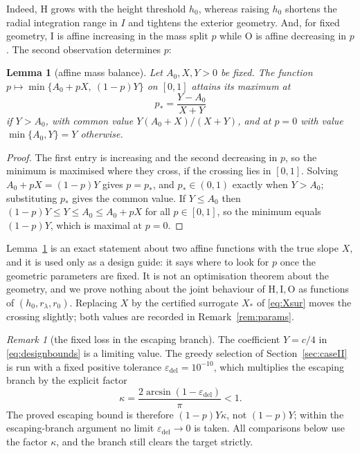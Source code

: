 \documentclass[11pt]{article}
\theoremstyle{plain}
\newtheorem{lemma}[theorem]{Lemma}
\theoremstyle{definition}
\theoremstyle{remark}
\newtheorem{remark}[theorem]{Remark}
\newcommand{\epsdel}{\varepsilon_{\mathrm{del}}}
\begin{document}
Indeed, $\mathrm{H}$ grows with the height threshold $h_{0}$, whereas raising $h_{0}$
shortens the radial integration range in $I$ and tightens the exterior geometry.
And, for fixed geometry, $\mathrm{I}$ is affine increasing in the mass split $p$
while $\mathrm{O}$ is affine decreasing in $p$. The second observation
determines $p$:

\begin{lemma}[affine mass balance]\label{lem:balance}
Let $A_{0},X,Y>0$ be fixed. The function
$p\mapsto\min\{A_{0}+pX,\ (1-p)Y\}$ on $[0,1]$ attains its maximum at
\[
  p_{*}=\frac{Y-A_{0}}{X+Y}
\]
if $Y>A_{0}$, with common value $Y(A_{0}+X)/(X+Y)$, and at $p=0$ with value
$\min\{A_0,Y\}=Y$ otherwise.
\end{lemma}

\begin{proof}
The first entry is increasing and the second decreasing in $p$, so the minimum
is maximised where they cross, if the crossing lies in $[0,1]$. Solving
$A_{0}+pX=(1-p)Y$ gives $p=p_{*}$, and $p_{*}\in(0,1)$ exactly when $Y>A_{0}$;
substituting $p_{*}$ gives the common value. If $Y\le A_{0}$ then
$(1-p)Y\le Y\le A_{0}\le A_{0}+pX$ for all $p\in[0,1]$, so the minimum equals
$(1-p)Y$, which is maximal at $p=0$.
\end{proof}

Lemma~\ref{lem:balance} is an exact statement about two affine functions with
the true slope $X$, and it is used only as a design guide: it says where to look
for $p$ once the geometric parameters are fixed. It is not an optimisation
theorem about the geometry, and we prove nothing about the joint behaviour of
$\mathrm{H},\mathrm{I},\mathrm{O}$ as functions of
$(h_{0},r_{\lambda},r_{0})$. Replacing $X$ by the certified surrogate $X_{*}$ of
\eqref{eq:Xsur} moves the crossing slightly; both values are recorded in
Remark~\ref{rem:params}.

\begin{remark}[the fixed loss in the escaping branch]\label{rem:kappaloss}
The coefficient $Y=c/4$ in \eqref{eq:designbounds} is a limiting value. The
greedy selection of Section~\ref{sec:caseII} is run with a fixed positive
tolerance $\epsdel=10^{-10}$, which multiplies the escaping branch by the
explicit factor
\[
  \kappa=\frac{2\arcsin(1-\epsdel)}{\pi}<1 .
\]
The proved escaping bound is therefore $(1-p)Y\kappa$, not $(1-p)Y$; within
the escaping-branch argument no limit $\epsdel\to0$ is taken. All comparisons below use the factor
$\kappa$, and the branch still clears the target strictly.
\end{remark}
\end{document}
